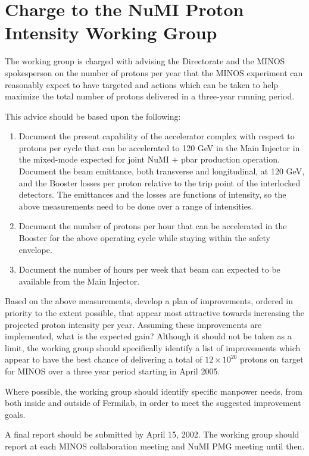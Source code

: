 \documentclass{article}
\begin{document}
\section {Charge to the NuMI Proton Intensity Working Group}

The working group is charged with advising the Directorate and the MINOS 
spokesperson on the number of protons per year that the MINOS experiment can 
reasonably expect to have targeted and actions which can be taken to help 
maximize the total number of protons delivered in a three-year running period.

This advice should be based upon the following:
\begin {enumerate}
\item Document the present capability of the accelerator complex with respect 
to protons per cycle that can be accelerated to 120 GeV in the Main Injector 
in the mixed-mode expected for joint NuMI + pbar production operation.  
Document the beam emittance, both transverse and longitudinal, at 120 GeV, 
and the Booster losses per proton relative to the trip point of the 
interlocked detectors.  The emittances and the losses are functions of 
intensity, so the above measurements need to be done over a range of 
intensities.
\item Document the number of protons per hour that can be accelerated in the 
Booster for the above operating cycle while staying within the safety envelope.
\item Document the number of hours per week that beam can expected to be 
available from the Main Injector.
\end {enumerate}

Based on the above measurements, develop a plan of improvements, ordered in 
priority to the extent possible, that appear most attractive towards increasing
the projected proton intensity per year.  Assuming these improvements are 
implemented, what is the expected gain?  Although it should not be taken as a 
limit, the working group should specifically identify a list of improvements 
which appear to have the best chance of delivering a total of 
$12\times10^{20}$ protons on 
target for MINOS over a three year period starting in April 2005.

Where possible, the working group should identify specific manpower needs, 
from both inside and outside of Fermilab, in order to meet the suggested 
improvement goals.

A final report should be submitted by April 15, 2002.  The working group should
report at each MINOS collaboration meeting and NuMI PMG meeting until then. 
\end{document}
